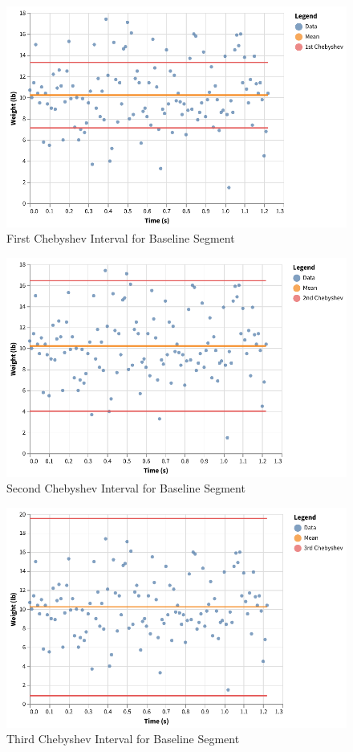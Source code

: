 \begin{figure}[ht]
    \centering
    \includegraphics{chart/00-intro/baseline-chebyshev-1.pdf}
    \caption{First Chebyshev Interval for Baseline Segment}
    \label{figure:00.baseline.chebyshev.1}
\end{figure}
%
\begin{figure}[ht]
    \centering
    \includegraphics{chart/00-intro/baseline-chebyshev-2.pdf}
    \caption{Second Chebyshev Interval for Baseline Segment}
    \label{figure:00.baseline.chebyshev.2}
\end{figure}
%
\begin{figure}[ht]
    \centering
    \includegraphics{chart/00-intro/baseline-chebyshev-3.pdf}
    \caption{Third Chebyshev Interval for Baseline Segment}
    \label{figure:00.baseline.chebyshev.3}
\end{figure}
